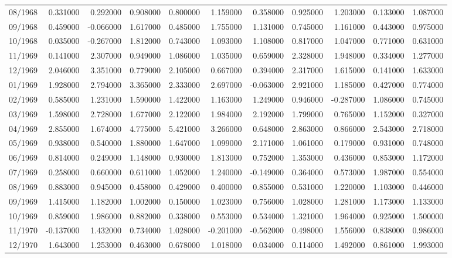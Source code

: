 \begin{tabular}{lrrrrrrrrrr}
08/1968 & 0.331000 & 0.292000 & 0.908000 & 0.800000 & 1.159000 & 0.358000 & 0.925000 & 1.203000 & 0.133000 & 1.087000 \\
09/1968 & 0.459000 & -0.066000 & 1.617000 & 0.485000 & 1.755000 & 1.131000 & 0.745000 & 1.161000 & 0.443000 & 0.975000 \\
10/1968 & 0.035000 & -0.267000 & 1.812000 & 0.743000 & 1.093000 & 1.108000 & 0.817000 & 1.047000 & 0.771000 & 0.631000 \\
11/1969 & 0.141000 & 2.307000 & 0.949000 & 1.086000 & 1.035000 & 0.659000 & 2.328000 & 1.948000 & 0.334000 & 1.277000 \\
12/1969 & 2.046000 & 3.351000 & 0.779000 & 2.105000 & 0.667000 & 0.394000 & 2.317000 & 1.615000 & 0.141000 & 1.633000 \\
01/1969 & 1.928000 & 2.794000 & 3.365000 & 2.333000 & 2.697000 & -0.063000 & 2.921000 & 1.185000 & 0.427000 & 0.774000 \\
02/1969 & 0.585000 & 1.231000 & 1.590000 & 1.422000 & 1.163000 & 1.249000 & 0.946000 & -0.287000 & 1.086000 & 0.745000 \\
03/1969 & 1.598000 & 2.728000 & 1.677000 & 2.122000 & 1.984000 & 2.192000 & 1.799000 & 0.765000 & 1.152000 & 0.327000 \\
04/1969 & 2.855000 & 1.674000 & 4.775000 & 5.421000 & 3.266000 & 0.648000 & 2.863000 & 0.866000 & 2.543000 & 2.718000 \\
05/1969 & 0.938000 & 0.540000 & 1.880000 & 1.647000 & 1.099000 & 2.171000 & 1.061000 & 0.179000 & 0.931000 & 0.748000 \\
06/1969 & 0.814000 & 0.249000 & 1.148000 & 0.930000 & 1.813000 & 0.752000 & 1.353000 & 0.436000 & 0.853000 & 1.172000 \\
07/1969 & 0.258000 & 0.660000 & 0.611000 & 1.052000 & 1.240000 & -0.149000 & 0.364000 & 0.573000 & 1.987000 & 0.554000 \\
08/1969 & 0.883000 & 0.945000 & 0.458000 & 0.429000 & 0.400000 & 0.855000 & 0.531000 & 1.220000 & 1.103000 & 0.446000 \\
09/1969 & 1.415000 & 1.182000 & 1.002000 & 0.150000 & 1.023000 & 0.756000 & 1.028000 & 1.281000 & 1.173000 & 1.133000 \\
10/1969 & 0.859000 & 1.986000 & 0.882000 & 0.338000 & 0.553000 & 0.534000 & 1.321000 & 1.964000 & 0.925000 & 1.500000 \\
11/1970 & -0.137000 & 1.432000 & 0.734000 & 1.028000 & -0.201000 & -0.562000 & 0.498000 & 1.556000 & 0.838000 & 0.986000 \\
12/1970 & 1.643000 & 1.253000 & 0.463000 & 0.678000 & 1.018000 & 0.034000 & 0.114000 & 1.492000 & 0.861000 & 1.993000 \\

\end{tabular}
